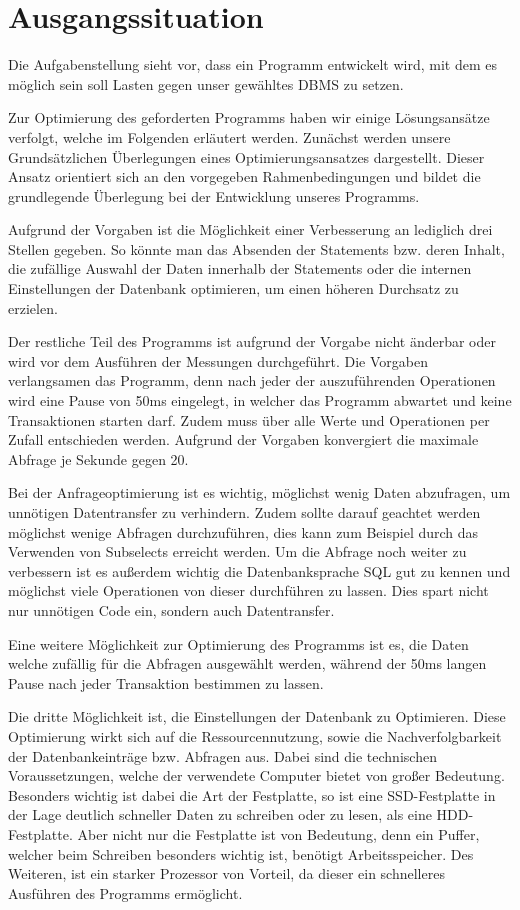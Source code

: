\section{Ausgangssituation}
Die Aufgabenstellung sieht vor, dass ein Programm entwickelt wird, mit dem es möglich sein soll 
Lasten gegen unser gewähltes DBMS zu setzen.

Zur Optimierung des geforderten Programms haben wir einige Lösungsansätze verfolgt, welche im 
Folgenden erläutert werden. Zunächst werden unsere Grundsätzlichen Überlegungen eines 
Optimierungsansatzes dargestellt. Dieser Ansatz orientiert sich an den vorgegeben Rahmenbedingungen 
und bildet die grundlegende Überlegung bei der Entwicklung unseres Programms.

Aufgrund der Vorgaben ist die Möglichkeit einer Verbesserung an lediglich drei
Stellen gegeben. So könnte man das Absenden der Statements bzw. deren Inhalt, die zufällige Auswahl der 
Daten innerhalb der Statements oder die internen Einstellungen der Datenbank optimieren, um einen 
höheren Durchsatz zu erzielen.

Der restliche Teil des Programms ist aufgrund der Vorgabe nicht änderbar oder wird vor dem 
Ausführen der Messungen durchgeführt. Die Vorgaben verlangsamen das Programm, denn nach jeder 
der auszuführenden Operationen wird eine Pause von 50ms eingelegt, in welcher das Programm abwartet 
und keine Transaktionen starten darf.  Zudem muss über alle Werte und Operationen per Zufall 
entschieden werden. Aufgrund der Vorgaben konvergiert die maximale Abfrage je Sekunde gegen 20.

Bei der Anfrageoptimierung ist es wichtig, möglichst wenig Daten abzufragen, um unnötigen 
Datentransfer zu verhindern. Zudem sollte darauf geachtet werden möglichst wenige Abfragen 
durchzuführen, dies kann zum Beispiel durch das Verwenden von Subselects erreicht werden. Um die 
Abfrage noch weiter zu verbessern ist es außerdem wichtig die Datenbanksprache SQL gut zu kennen 
und möglichst viele Operationen von dieser durchführen zu lassen. Dies spart nicht nur unnötigen 
Code ein, sondern auch Datentransfer.

Eine weitere Möglichkeit zur Optimierung des Programms ist es, die Daten welche zufällig für die 
Abfragen ausgewählt werden, während der 50ms langen Pause nach jeder Transaktion bestimmen zu 
lassen. 

Die dritte Möglichkeit ist, die Einstellungen der Datenbank zu Optimieren. Diese Optimierung wirkt 
sich auf die Ressourcennutzung, sowie die Nachverfolgbarkeit der Datenbankeinträge bzw. Abfragen 
aus. Dabei sind die technischen Voraussetzungen, welche der verwendete Computer bietet von großer 
Bedeutung. Besonders wichtig ist dabei die Art der Festplatte, so ist eine SSD-Festplatte in der 
Lage deutlich schneller Daten zu schreiben oder zu lesen, als eine HDD-Festplatte. Aber nicht nur 
die Festplatte ist von Bedeutung, denn ein Puffer, welcher beim Schreiben besonders wichtig ist, 
benötigt Arbeitsspeicher. Des Weiteren, ist ein starker Prozessor von Vorteil, da dieser ein 
schnelleres Ausführen des Programms ermöglicht.

\clearpage